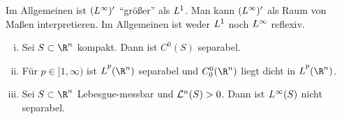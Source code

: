 \nnBemerkung
Im Allgemeinen ist $(L^{\infty})'$ \enquote{größer} als $L^{1}$.
Man kann $(L^{\infty})'$ als Raum von Maßen interpretieren.
Im Allgemeinen ist weder $L^{1}$ noch $L^{\infty}$ reflexiv.

\begin{thSatz} \label{vl26:satz10.14}
    \begin{enumerate}[(i)]
        \item \label{vl26:satz10.14:i}
            Sei $S\subset\R^n$ kompakt. Dann ist $C^0(S)$ separabel.
            
        \item \label{vl26:satz10.14:ii}
            Für $p\in[1,\infty)$ ist $\Lpp(\R^n)$ separabel und
            $\Coo(\R^n)$ liegt dicht in $\Lpp(\R^n)$.
            
        \item \label{vl26:satz10.14:iii}
            Sei $S\subset\R^n$ Lebesgue-messbar und $\mathcal{L}^n(S)>0$. Dann ist
            $L^{\infty}(S)$ nicht separabel.
    \end{enumerate}
\end{thSatz}

